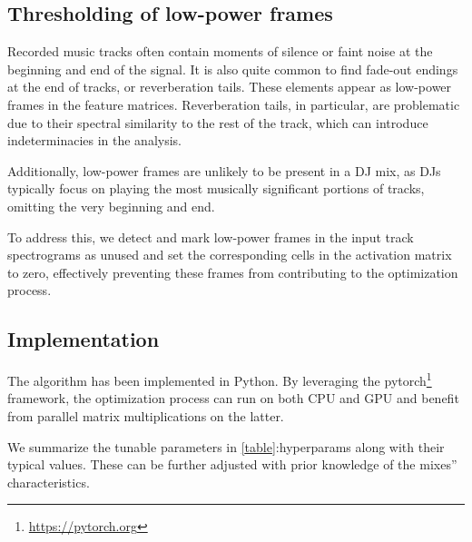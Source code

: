 \subsection{Thresholding of low-power frames}

Recorded music tracks often contain moments of silence or faint noise at
the beginning and end of the signal. It is also quite common to find
fade-out endings at the end of tracks, or reverberation tails. These
elements appear as low-power frames in the feature matrices.
Reverberation tails, in particular, are problematic due to their
spectral similarity to the rest of the track, which can introduce
indeterminacies in the analysis.

Additionally, low-power frames are unlikely to be present in a DJ mix,
as DJs typically focus on playing the most musically significant
portions of tracks, omitting the very beginning and end.

To address this, we detect and mark low-power frames in the input track
spectrograms as unused and set the corresponding cells in the activation
matrix to zero, effectively preventing these frames from contributing to
the optimization process.

\subsection{Implementation}

The algorithm has been implemented in Python. By leveraging the
pytorch\footnote{\url{https://pytorch.org}} framework, the optimization
process can run on both CPU and GPU and benefit from parallel matrix
multiplications on the latter.

We summarize the tunable parameters in
\hyperref[table]{{[}table{]}}:hyperparams along with their typical
values. These can be further adjusted with prior knowledge of the
mixes'' characteristics.

